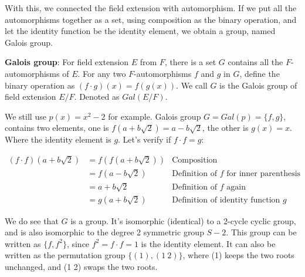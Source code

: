 \documentclass{article}
\begin{document}
With this, we connected the field extension with automorphism. If we put all the automorphisms together as a set, using composition as the binary operation, and let the identity function be the identity element, we obtain a group, named Galois group.

\begin{definition}
\textbf{Galois group}: For field extension $E$ from $F$, there is a set $G$ contains all the $F$-automorphisms of $E$. For any two $F$-automorphisms $f$ and $g$ in $G$, define the binary operation as $(f \cdot g)(x) = f(g(x))$. We call $G$ is the Galois group of field extension $E/F$. Denoted as $Gal(E/F)$.
\end{definition}

We still use $p(x) = x^2 - 2$ for example. Galois group $G = Gal(p) = \{f, g\}$, contains two elements, one is $f(a + b\sqrt{2}) = a - b\sqrt{2}$, the other is $g(x) = x$. Where the identity element is $g$. Let's verify if $f \cdot f = g$:

\[
\begin{array}{rll}
(f \cdot f)(a + b\sqrt{2}) & = f(f(a + b\sqrt{2})) & \text{Composition} \\
  & = f(a - b\sqrt{2}) & \text{Definition of $f$ for inner parenthesis} \\
  & = a + b\sqrt{2} & \text{Definition of $f$ again} \\
  & = g(a + b\sqrt{2}) & \text{Definition of identity function $g$}
\end{array}
\]

We do see that $G$ is a group. It's isomorphic (identical) to a 2-cycle cyclic group, and is also isomorphic to the degree 2 symmetric group $S-2$. This group can be written as $\{f, f^2\}$, since $f^2 = f \cdot f = 1$ is the identity element. It can also be written as the permutation group $\{(1), (1\ 2)\}$, where (1) keeps the two roots unchanged, and (1 2) swaps the two roots.

\begin{Exercise}
\end{Exercise}
\end{document}
